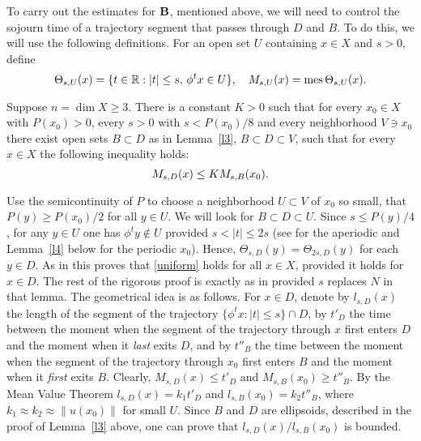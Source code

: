 To carry out the estimates for ${\bold B}$, mentioned above, we will
need to control
the sojourn time of a trajectory segment that passes through $D$ and $B$.
To do this, we will use the following definitions. 
For an open set $U$ containing $x\in X$ and $s> 0$, define
\begin{equation}
\Theta_{s,U} (x)  = \{ t\in \bbR: |t| \leq s,\,\phi^t x \in U
\},\quad
M_{s,U}(x)  = \mes \Theta_{s,U}(x).
\lb{thetam}
\end{equation}
\begin{lem} 
Suppose $n=\dim X\geq 3$.
There is a constant $K>0$ such that 
for every $x_0\in X$  with $P(x_0)>0$,
every $s>0$ with $s<P(x_0)/8$ and every
neighborhood $V\ni x_0$
there exist open sets $B\subset D$ as in Lemma~\ref{l3},
$B\subset D\subset V$, such that for every $x\in X$
the following inequality holds: 
\begin{equation}
M_{s,D}(x) \leq KM_{s,B} (x_0).
\lb{uniform}
\end{equation}
\end{lem}
\begin{pf} Use the semicontinuity of $P$ to choose 
 a neighborhood $U\subset V$ of $x_0$
so small, that $P(y)\geq P(x_0)/2$ for all $y\in U$. We will look
for $B\subset D\subset U$. Since $s\leq P(y)/4$, for any $y\in U$
one has $\phi^ty\not\in U$ provided $s<|t|\leq 2s$ (see 
\cite[Lemma~2.4]{clms} for the aperiodic and Lemma~\ref{l4} below for
the periodic $x_0$). Hence, $\Theta_{s,D}(y)=\Theta_{2s,D}(y)$ for each
$y\in D$. As in \cite[Lemma~2.4]{clms} this proves that
\eqref{uniform} holds for all $x\in X$, provided it holds
for $x\in D$.
The rest of the rigorous proof  is exactly as in
\cite[Lemma~2.5]{clms} provided  $s$ replaces $N$ in that lemma.
The geometrical idea is as follows. For $x\in D$, denote by
$l_{s,D}(x)$ the length of the segment of the trajectory
$\{\phi^tx:|t|\leq s\}\cap D$, by $t'_D$ the time 
between the moment when the segment of the trajectory through $x$
first enters $D$ and the moment when it {\it last} exits $D$, and by
$t''_B$ the time 
between the moment when the segment of the trajectory through $x_0$
first enters $B$ and the moment when it {\it first} exits $B$. Clearly,
$M_{s,D}(x)\leq t'_D$ and $M_{s,B}(x_0)\geq t''_B$.
 By the Mean Value Theorem
$l_{s,D}(x)=k_1t'_D$ and $l_{s,B}(x_0)=k_2t''_B$,
where $k_1\approx k_2\approx \|u(x_0)\|$ for small $U$. 
Since $B$ and $D$ are ellipsoids, 
described in the proof of Lemma~\ref{l3} above, one can prove that
$l_{s,D}(x)/l_{s,B}(x_0)$ is bounded.
\end{pf}

